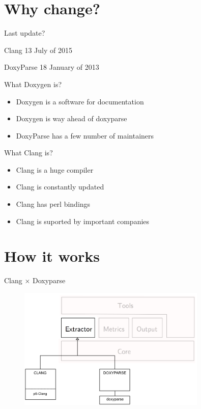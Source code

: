 \section{Why change?} %
\label{sec:why_change_}

\begin{frame}{Last update?}
\begin{Parallel}[v]{5cm}{5cm}
    \ParallelLText%
    {

        {\ttfamily Clang}  13 July of 2015
    }
    \ParallelRText%
    {
        {\ttfamily DoxyParse} 18 January of 2013
	}
\end{Parallel}
\end{frame}

\begin{frame}{What Doxygen is?}
   \begin{itemize} 
        \item Doxygen is a software for documentation
        \item Doxygen is way ahead of doxyparse
        \item DoxyParse has a few number of maintainers
    \end{itemize} 
\end{frame}

\begin{frame}{What Clang is?}
   \begin{itemize} 
        \item Clang is a huge compiler  
        \item Clang is constantly updated
        \item Clang has perl bindings
        \item Clang is suported by important companies
    \end{itemize}
\end{frame}


\section{How it works} %
\label{sec:how_it_works}

\begin{frame}{Clang $\times$ Doxyparse}
\begin{figure}[htbp]
    \centering
        \includegraphics[width=0.8\textwidth]{conteudo/how_it_works.png}
    \caption{}
    \label{fig:tipografia}
\end{figure}
\end{frame}

